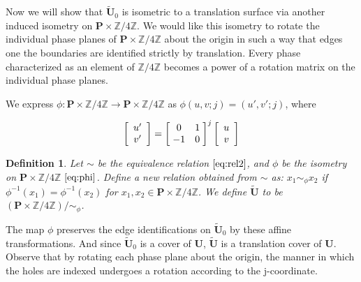 \documentclass[]{article}
\newtheorem{Def}{Definition}[subsection]
\begin{document}
 Now we will show that $\tilde{\mathbf{U}}_0$ is isometric to a translation surface via another induced isometry on $\mathbf{P}\times\mathbb{Z}/4\mathbb{Z}$. We would like this isometry to rotate the individual phase planes of $\mathbf{P}\times\mathbb{Z}/4\mathbb{Z}$ about the origin in such a way that edges one the boundaries are identified strictly by translation. Every phase characterized as an element of $\mathbb{Z}/4\mathbb{Z}$ becomes a power of a rotation matrix on the individual phase planes.


We express $\phi:\mathbf{P}\times\mathbb{Z}/4\mathbb{Z} \rightarrow \mathbf{P}\times\mathbb{Z}/4\mathbb{Z}$ as $\phi(u,v;j) = (u',v';j)$, where

\begin{equation}
	\left[\begin{array}{c}
		u'\\v'
	\end{array}\right] =
		\left[ \hspace{1mm} \begin{matrix}
				0 & 1\\
				-1 & 0
			\end{matrix}\hspace{1mm}\right]^{j}\left[\begin{array}{c}
					u\\v
				\end{array}\right]
\label{eq:phi}
\end{equation}



\begin{Def} Let $\sim$ be the equivalence relation $\eqref{eq:rel2}$, and $\phi$ be the isometry on $\mathbf{P}\times\mathbb{Z}/4\mathbb{Z}$ $\eqref{eq:phi}$. Define a new relation obtained from $\sim$ as:  $x_1\sim_{\phi}x_2$ if $\phi^{-1}(x_1) = \phi^{-1}(x_2)$ for $x_1,x_2\in\mathbf{P}\times\mathbb{Z}/4\mathbb{Z}$. We define $\tilde{\mathbf{U}}$ to be  $(\mathbf{P}\times\mathbb{Z}/4\mathbb{Z})/\sim_{\phi}$.\label{eq:simphi}
\end{Def}

The map $\phi$ preserves the edge identifications on $\tilde{\mathbf{U}}_0$ by these affine transformations. And since $\tilde{\mathbf{U}}_0$ is a cover of $\mathbf{U}$, $\tilde{\mathbf{U}}$ is a translation cover of $\mathbf{U}$. Observe that by rotating each phase plane about the origin, the manner in which the holes are indexed undergoes a rotation according to the j-coordinate.

\begin{figure}[H]
\centering

\end{figure}
\end{document}
